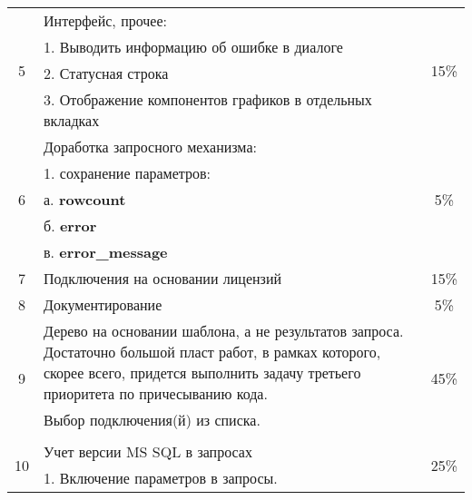 \documentclass[10pt,a4paper]{article}
\begin{document}
\begin{table}
\begin{center}
\begin{tabularx}{\linewidth}{|c|X|c|}
		\hline

		\multirow{4}{*}{5} & Интерфейс, прочее: & \multirow{4}{*}{15\%} \\

		   & 1. Выводить информацию об ошибке в диалоге & \\

		   & 2. Статусная строка & \\

		   & 3. Отображение компонентов графиков в отдельных вкладках & \\

		\hline

		\multirow{5}{*}{6} & Доработка запросного механизма: & \multirow{5}{*}{5\%} \\

		   & 1. сохранение параметров: & \\

		   & а. \textbf{rowcount} & \\

		   & б. \textbf{error} & \\

		   & в. \textbf{error\_message} & \\

		\hline

		7  & Подключения на основании лицензий & 15\% \\

		\hline

		8  & Документирование & 5\% \\

		\hline

		\multirow{3}{*}{9} & Дерево на основании шаблона, а не результатов
		запроса. Достаточно большой пласт работ, в рамках которого, скорее
		всего, придется выполнить задачу третьего приоритета по причесыванию
		кода. & \multirow{3}{*}{45\%} \\

		    & Выбор подключения(й) из списка. & \\

		    & & \\

		\hline

		\multirow{2}{*}{10} & Учет версии MS SQL в запросах & \multirow{2}{*}{25\%} \\

		   & 1. Включение параметров в запросы. & \\

		\hline


\end{tabularx}
\end{center}
\end{table}
\end{document}
